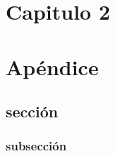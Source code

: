 \documentclass[]{tesisusb}
\begin{document}
\indicegeneral
\listadetablas
\listadefiguras

\begin{onehalfspace}
\cuerpo



\chapter{Capitulo 2}
\lipsum

\apendices

\chapter{Apéndice}
\section{sección}
\subsection{subsección}

%
%

\end{onehalfspace}
\end{document}
